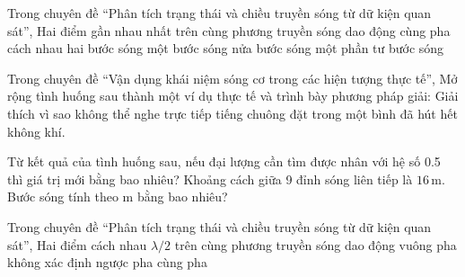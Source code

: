 \begin{ex}
Trong chuyên đề “Phân tích trạng thái và chiều truyền sóng từ dữ kiện quan sát”, Hai điểm gần nhau nhất trên cùng phương truyền sóng dao động cùng pha cách nhau
\choice
{hai bước sóng}
{\True một bước sóng}
{nửa bước sóng}
{một phần tư bước sóng}
\end{ex}

\begin{ex}
Trong chuyên đề “Vận dụng khái niệm sóng cơ trong các hiện tượng thực tế”, Mở rộng tình huống sau thành một ví dụ thực tế và trình bày phương pháp giải: Giải thích vì sao không thể nghe trực tiếp tiếng chuông đặt trong một bình đã hút hết không khí.
\choiceTF

\end{ex}

\begin{ex}
Từ kết quả của tình huống sau, nếu đại lượng cần tìm được nhân với hệ số 0.5 thì giá trị mới bằng bao nhiêu? Khoảng cách giữa 9 đỉnh sóng liên tiếp là $16\,\text{m}$. Bước sóng tính theo m bằng bao nhiêu?
\end{ex}

\begin{ex}
Trong chuyên đề “Phân tích trạng thái và chiều truyền sóng từ dữ kiện quan sát”, Hai điểm cách nhau $\lambda/2$ trên cùng phương truyền sóng dao động
\choice
{vuông pha}
{không xác định}
{\True ngược pha}
{cùng pha}
\end{ex}

